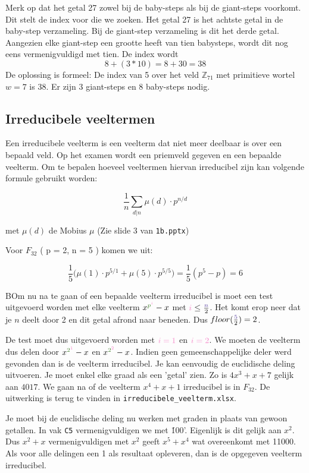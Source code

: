 Merk op dat het getal 27 zowel bij de baby-steps als bij de giant-steps voorkomt. Dit stelt de index voor die we zoeken. Het getal 27 is het achtste getal in de baby-step verzameling. Bij de giant-step verzameling is dit het derde getal. Aangezien elke giant-step een grootte heeft van tien babysteps, wordt dit nog eens vermenigvuldigd met tien. De index wordt $$8 + (3 * 10) = 8 + 30 = 38$$
De oplossing is formeel: De index van 5 over het veld $\mathbb{Z}_{71}$ met primitieve wortel $w = 7$ is 38. Er zijn 3 giant-steps en 8 baby-steps nodig.

\subsection{Irreducibele veeltermen}
Een irreducibele veelterm is een veelterm dat niet meer deelbaar is over een bepaald veld. Op het examen wordt een priemveld gegeven en een bepaalde veelterm. Om te bepalen hoeveel veeltermen hiervan irreducibel zijn kan volgende formule gebruikt worden: 

$$\frac{1}{n} \sum_{d|n} \mu(d) \cdot p^{n/d}$$ 

met $\mu(d)$ de Mobius $\mu$ (Zie slide 3 van \texttt{1b.pptx})


Voor $F_{32}$ ( p = 2, n = 5 ) komen we uit:

$$\frac{1}{5} \bigg( \mu(1) \cdot p^{5/1} + \mu(5) \cdot p^{5/5} \bigg) = \frac{1}{5} ( p^5 - p ) = 6$$

BOm nu na te gaan of een bepaalde veelterm irreducibel is moet een test uitgevoerd worden met elke veelterm $x^{\acca{p}^{\accb{i}}} - x$ met $\accb{i} \leq \frac{\accc{n}}{2}$. Het komt erop neer dat je $n$ deelt door 2 en dit getal afrond naar beneden. Dus $floor(\frac{\accc{5}}{2}) = 2$. 

De test moet dus uitgevoerd worden met $\accb{i = 1}$ en $\accb{i = 2}$. We moeten de veelterm  dus delen door $x^{\acca{2}^{\accb{1}}} - x$ en $x^{\acca{2}^{\accb{2}}} - x$. Indien geen gemeenschappelijke deler werd gevonden dan is de veelterm irreducibel. Je kan eenvoudig de euclidische deling uitvoeren. Je moet enkel elke graad als een 'getal' zien. Zo is $4x^3 + x + 7$ gelijk aan $4017$. We gaan na of de veelterm $x^4 + x + 1$ irreducibel is in $F_{32}$. De uitwerking is terug te vinden in \texttt{irreducibele\_veelterm.xlsx}.

Je moet bij de euclidische deling nu werken met graden in plaats van gewoon getallen. In vak \texttt{C5} vermenigvuldigen we met \'100'. Eigenlijk is dit gelijk aan $x^2$. Dus $x^2 + x$ vermenigvuldigen met $x^2$ geeft $x^5 + x^4$ wat overeenkomt met 11000. Als voor alle delingen een 1 als resultaat opleveren, dan is de opgegeven veelterm irreducibel.


